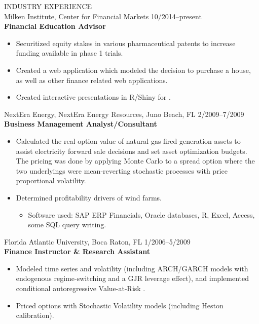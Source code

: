 \documentclass[9pt]{article}
\begin{document}
\vspace{10pt}
INDUSTRY EXPERIENCE \\
Milken Institute, Center for Financial Markets \hfill \hfill 10/2014--present\\
{\bf Financial Education Advisor} \\
\begin{itemize}[noitemsep, nolistsep]
  \item Securitized equity stakes in various pharmaceutical patents to increase funding available in phase 1 trials.
  \item Created a web application which modeled the decision to purchase a house, as well as other finance related web applications. 
    \item Created interactive presentations in R/Shiny for {\color{Blue}{5MinuteFinance.org}}.
\end{itemize}
\vspace{5pt}
NextEra Energy, NextEra Energy Resources, Juno Beach, FL \hfill  \hfill 2/2009--7/2009\\
{\bf Business Management Analyst/Consultant}
\begin{itemize}[noitemsep, nolistsep]
\item Calculated the real option value of natural gas fired generation assets to assist electricity forward sale decisions and set asset optimization budgets.  The pricing was done by applying Monte Carlo to a spread option where the two underlyings were mean-reverting stochastic processes with price proportional volatility.
\item Determined profitability drivers of wind farms.
\begin{itemize}[noitemsep, nolistsep]
\item Software used: SAP ERP Financials, Oracle databases, R, Excel, Access, some SQL query writing.
\end{itemize}
\end{itemize}
\vspace{5pt}
Florida Atlantic University, Boca Raton, FL \hfill  \hfill 1/2006--5/2009\\
{\bf Finance Instructor \& Research Assistant}
\begin{itemize}[noitemsep, nolistsep]
\item Modeled time series and volatility (including ARCH/GARCH models with endogenous regime-switching and a GJR leverage effect), and implemented conditional autoregressive Value-at-Risk .
\item Priced options with Stochastic Volatility models (including Heston calibration).
\end{itemize}
\end{document}
